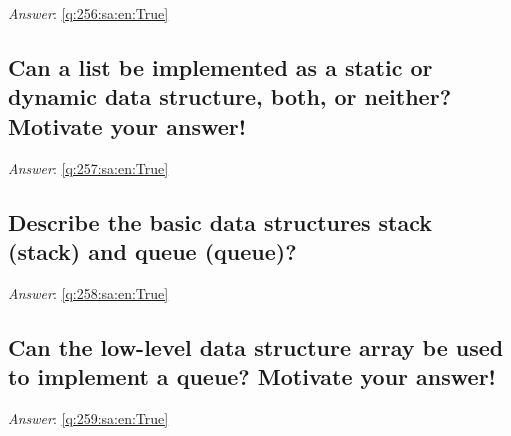 \documentclass[a4paper,11pt,oneside]{article}
\begin{document}
\begin{sloppypar}
\noindent\makebox[\textwidth]{\hrulefill}

\vspace{1cm}

\textit{Answer}: \autoref{q:256:sa:en:True}



\subsection{Can a list be implemented as a static or dynamic data structure, both, or neither? Motivate your answer!}

\label{q:257:sa:en:False}

\vspace{2cm}

\noindent\makebox[\textwidth]{\hrulefill}

\vspace{1cm}

\textit{Answer}: \autoref{q:257:sa:en:True}



\subsection{Describe the basic data structures stack (stack) and queue (queue)?}

\label{q:258:sa:en:False}

\vspace{2cm}

\noindent\makebox[\textwidth]{\hrulefill}

\vspace{1cm}

\textit{Answer}: \autoref{q:258:sa:en:True}



\subsection{Can the low-level data structure array be used to implement a queue? Motivate your answer!}

\label{q:259:sa:en:False}

\vspace{2cm}

\noindent\makebox[\textwidth]{\hrulefill}

\vspace{1cm}

\textit{Answer}: \autoref{q:259:sa:en:True}




\end{sloppypar}
\end{document}
